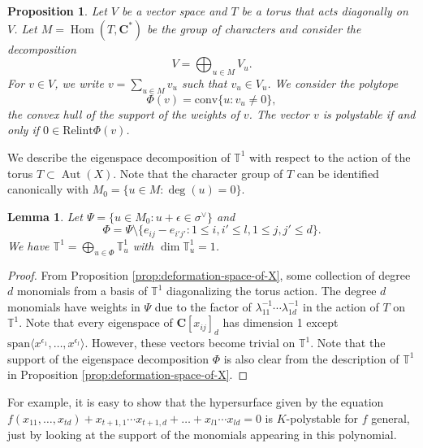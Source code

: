 \documentclass[letterpaper,11pt]{amsart}
\theoremstyle{plain}
\newtheorem{lemm}[theo]{Lemma}
\newtheorem{prop}[theo]{Proposition}
\theoremstyle{definition}
\theoremstyle{remark}
\newcommand{\eps}{\epsilon}
\newcommand{\bb}[1]{\mathbb{#1}}
\newcommand{\CC}{\mathbf{C}}
\newcommand{\sta}{^{*}}
\newcommand{\dual}{^{\vee}}
\DeclareMathOperator{\Hom}{Hom}
\DeclareMathOperator{\Aut}{Aut}
\begin{document}
    \begin{prop}
        Let $V$ be a vector space and $T$ be a torus that acts diagonally on $V$. Let $M = \Hom(T, \CC\sta)$ be the group of characters and consider the decomposition
        $$ V = \bigoplus_{u \in M} V_{u}.$$
        For $v \in V$, we write $v = \sum_{u \in M} v_{u}$ such that $v_{u} \in V_{u}$. We consider the polytope
        $$ \Phi(v) = \mathrm{conv} \{ u : v_{u} \neq 0\},$$
        the convex hull of the support of the weights of $v$. The vector $v$ is polystable if and only if $0 \in \mathrm{Relint} \Phi(v)$.
    \end{prop}

    We describe the eigenspace decomposition of $\bb{T}^{1}$ with respect to the action of the torus $T \subset \Aut(X)$. Note that the character group of $T$ can be identified canonically with $M_{0} = \{ u \in M : \deg(u) = 0\}$.

    \begin{lemm} \label{lemm:defi-of-Phi}
        Let $\Psi = \{ u \in M_{0} : u + \eps \in \sigma\dual \}$ and
        $$\Phi = \Psi \setminus \{ e_{ij} - e_{i'j'} : 1 \leq i,i' \leq l, 1 \leq j,j' \leq d \}.$$
        We have $\bb{T}^{1} = \bigoplus_{u \in \Phi} \bb{T}^{1}_{u}$ with $\dim \bb{T}^{1}_{u} = 1$.
    \end{lemm}
    \begin{proof}
        From Proposition \ref{prop:deformation-space-of-X}, some collection of degree $d$ monomials from a basis of $\bb{T}^{1}$ diagonalizing the torus action. The degree $d$ monomials have weights in $\Psi$ due to the factor of $\lambda_{11}^{-1}\cdots \lambda_{1d}^{-1}$ in the action of $T$ on $\bb{T}^{1}$. Note that every eigenspace of $\CC[x_{ij}]_{d}$ has dimension 1 except $\mathrm{span} \langle x^{\eps_{1}},\ldots, x^{\eps_{l}}\rangle$. However, these vectors become trivial on $\bb{T}^{1}$. Note that the support of the eigenspace decomposition $\Phi$ is also clear from the description of $\bb{T}^{1}$ in Proposition \ref{prop:deformation-space-of-X}.
    \end{proof}

    For example, it is easy to show that the hypersurface given by the equation $f(x_{11},\ldots, x_{td}) + x_{t+1,1}\cdots x_{t+1,d} + \ldots + x_{l1} \cdots x_{ld} = 0 $ is $K$-polystable for $f$ general, just by looking at the support of the monomials appearing in this polynomial.
\end{document}
